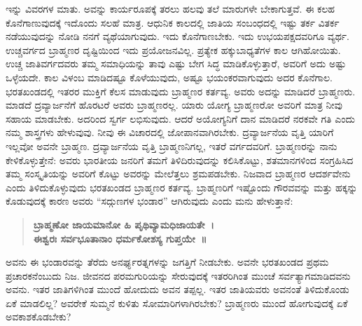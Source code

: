 ಇನ್ನು ವಿವರಗಳ ಮಾತು. ಅವನ್ನು ಕಾರ್ಯರೂಪಕ್ಕೆ ತರಲು ಹಲವು ತಲೆ ಮಾರುಗಳೇ ಬೇಕಾಗುತ್ತವೆ. ಈ ಕಲಹ ಕೊನೆಗಾಣುವುದಕ್ಕೆ ಇದೊಂದು ಸಲಹೆ ಮಾತ್ರ. ಆಧುನಿಕ ಕಾಲದಲ್ಲಿ ಜಾತಿಯ ಸಂಬಂಧದಲ್ಲಿ ಇಷ್ಟು ತರ್ಕ ವಿತರ್ಕ ನಡೆಯುವುದನ್ನು ನೋಡಿ ನನಗೆ ವ್ಯಥೆಯಾಗುವುದು. ಇದು ಕೊನೆಗಾಣಬೇಕು. ಇದು ಉಭಯಪಕ್ಷದವರಿಗೂ ವ್ಯರ್ಥ. ಉಚ್ಚವರ್ಗದ ಬ್ರಾಹ್ಮಣರ ದೃಷ್ಟಿಯಿಂದ ಇದು ಪ್ರಯೋಜನವಿಲ್ಲ. ಪ್ರತ್ಯೇಕ ಹಕ್ಕುಬಾಧ್ಯತೆಗಳ ಕಾಲ ಆಗಿಹೋಯಿತು. ಉಚ್ಚ ಜಾತಿವರ್ಗದವರು ತಮ್ಮ ಸಮಾಧಿಯನ್ನು ತಾವು ಎಷ್ಟು ಬೇಗ ಸಿದ್ಧ ಮಾಡಿಕೊಳ್ಳುತ್ತಾರೆ, ಅವರಿಗೆ ಅದು ಅಷ್ಟು ಒಳ್ಳೆಯದೇ. ಕಾಲ ವಿಳಂಬ ಮಾಡಿದಷ್ಟೂ ಕೊಳೆಯುವುದು, ಅಷ್ಟೂ ಭಯಂಕರವಾಗುವುದು ಅದರ ಕೊನೆಗಾಲ. ಭರತಖಂಡದಲ್ಲಿ ಇತರರ ಮುಕ್ತಿಗೆ ಕೆಲಸ ಮಾಡುವುದು ಬ್ರಾಹ್ಮಣರ ಕರ್ತವ್ಯ. ಅವರು ಅದನ್ನು ಮಾಡಿದರೆ ಬ್ರಾಹ್ಮಣರು. ಮಾಡದೆ ದ್ರವ್ಯಾರ್ಜನೆಗೆ ಹೊರಟರೆ ಅವರು ಬ್ರಾಹ್ಮಣರಲ್ಲ. ಯಾರು ಯೋಗ್ಯ ಬ್ರಾಹ್ಮಣರೋ ಅವರಿಗೆ ಮಾತ್ರ ನೀವು ಸಹಾಯ ಮಾಡಬೇಕು. ಅದರಿಂದ ಸ್ವರ್ಗ ಲಭಿಸುವುದು. ಆದರೆ ಅಯೋಗ್ಯನಿಗೆ ದಾನ ಮಾಡಿದರೆ ನರಕವೇ ಗತಿ ಎಂದು ನಮ್ಮ ಶಾಸ್ತ್ರಗಳು ಹೇಳುವುವು. ನೀವು ಈ ವಿಚಾರದಲ್ಲಿ ಜೋಪಾನವಾಗಿರಬೇಕು. ದ್ರವ್ಯಾರ್ಜನೆಯ ವೃತ್ತಿ ಯಾರಿಗೆ ಇಲ್ಲವೋ ಅವನೇ ಬ್ರಾಹ್ಮಣ. ದ್ರವ್ಯಾರ್ಜನೆಯ ವೃತ್ತಿ ಬ್ರಾಹ್ಮಣನಿಗಲ್ಲ, ಇತರೆ ವರ್ಗದವರಿಗೆ. ಬ್ರಾಹ್ಮಣರನ್ನು ನಾನು ಕೇಳಿಕೊಳ್ಳುತ್ತೇನೆ: ಅವರು ಭಾರತೀಯ ಜನರಿಗೆ ತಮಗೆ ತಿಳಿದಿರುವುದನ್ನು ಕಲಿಸಿಕೊಟ್ಟು, ಶತಮಾನಗಳಿಂದ ಸಂಗ್ರಹಿಸಿದ ತಮ್ಮ ಸಂಸ್ಕೃತಿಯನ್ನು ಅವರಿಗೆ ಕೊಟ್ಟು ಅವರನ್ನು ಮೇಲೆತ್ತಲು ಶ್ರಮಪಡಬೇಕು. ನಿಜವಾದ ಬ್ರಾಹ್ಮಣರ ಆದರ್ಶವೇನು ಎಂದು ತಿಳಿದುಕೊಳ್ಳುವುದು ಭರತಖಂಡದ ಬ್ರಾಹ್ಮಣರ ಕರ್ತವ್ಯ. ಬ್ರಾಹ್ಮಣರಿಗೆ ಇಷ್ಟೊಂದು ಗೌರವವನ್ನು ಮತ್ತು ಹಕ್ಕನ್ನು ಕೊಡುವುದಕ್ಕೆ ಕಾರಣ ಅವರು “ಸದ್ಗುಣಗಳ ಭಂಡಾರ” ಆಗಿರುವುದು ಎಂದು ಮನು ಹೇಳುತ್ತಾನೆ:

\begin{verse}
\textbf{ಬ್ರಾಹ್ಮಣೋ ಜಾಯಮಾನೋ ಹಿ ಪೃಥಿವ್ಯಾಮಧಿಜಾಯತೇ~।}\\\textbf{ಈಶ್ವರಃ ಸರ್ವಭೂತಾನಾಂ ಧರ್ಮಕೋಶಸ್ಯ ಗುಪ್ತಯೇ~॥}
\end{verse}


ಅವನು ಈ ಭಂಡಾರವನ್ನು ತೆರೆದು ಅನರ್ಘ್ಯರತ್ನಗಳನ್ನು ಜಗತ್ತಿಗೆ ನೀಡಬೇಕು. ಅವನೇ ಭರತಖಂಡದ ಪ್ರಥಮ ಪ್ರಚಾರಕನೆಂಬುದು ನಿಜ. ಜೀವನದ ಪರಮಗುರಿಯನ್ನು ಸೇರುವುದಕ್ಕೆ ಇತರರಿಗಿಂತ ಮುಂಚೆ ಸರ್ವತ್ಯಾಗಮಾಡಿದವನು ಅವನು. ಇತರ ಜಾತಿಗಳಿಗಿಂತ ಮುಂದೆ ಹೋದುದು ಅವನ ತಪ್ಪಲ್ಲ. ಇತರ ಜಾತಿಯವರು ಅವನಂತೆ ತಿಳಿದುಕೊಂಡು ಏಕೆ ಮಾಡಲಿಲ್ಲ? ಅವರೇಕೆ ಸುಮ್ಮನೆ ಕುಳಿತು ಸೋಮಾರಿಗಳಾಗಿರಬೇಕು? ಬ್ರಾಹ್ಮಣರು ಮುಂದೆ ಹೋಗುವುದಕ್ಕೆ ಏಕೆ ಅವಕಾಶಕೊಡಬೇಕು?

